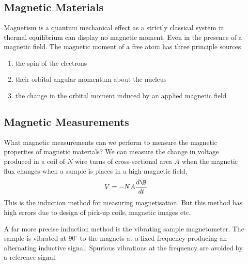 \documentclass[a4paper, 11pt, normalem]{report}
\begin{document}
\chapter{}
\section{Magnetic Materials}
Magnetism is a quantum mechanical effect as a strictly classical system in thermal equilibrium can display no magnetic moment. 
Even in the presence of a magnetic field. 
The magnetic moment of a free atom has three principle sources
\begin{enumerate}
    \item the spin of the electrons 
    \item their orbital angular momentum about the nucleus
    \item the change in the orbital moment induced by an applied magnetic field
\end{enumerate}

\section{Magnetic Measurements}
What magnetic measurements can we perform to measure the magnetic properties of magnetic materials?
We can measure the change in voltage produced in a coil of $N$ wire turns of cross-sectional area $A$ when the magnetic flux changes when a sample is places in a high magnetic field,
\begin{equation}
    V = -NA\frac{d\B}{dt}
\end{equation}
This is the induction method for measuring magnetisation. 
But this method has high errors due to design of pick-up coils, magnetic images etc. 

A far more precise induction method is the vibrating sample magnetometer. 
The sample is vibrated at $90^\circ$ to the magnets at a fixed frequency producing an alternating inductive signal.
Spurious vibrations at the frequency are avoided by a reference signal.
\end{document}
